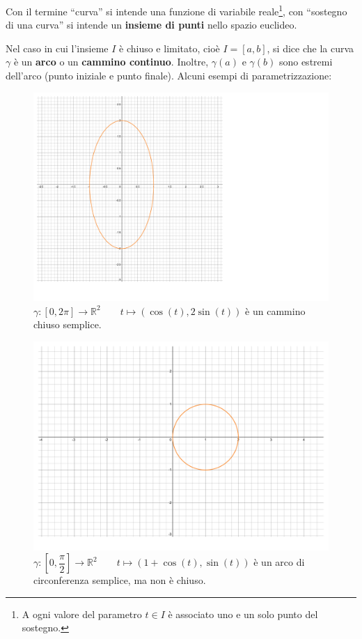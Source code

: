 \documentclass[a4paper]{article}
\newcommand{\dquotes}[1]{``#1''}
\begin{document}
	\noindent
	Con il termine \dquotes{curva} si intende una funzione di variabile reale\footnote{A ogni valore del parametro $t \in I$ è associato uno e un solo punto del sostegno.}, con \dquotes{sostegno di una curva} si intende un \textbf{insieme di punti} nello spazio euclideo.\newline

	\noindent
	Nel caso in cui l'insieme $I$ è chiuso e limitato, cioè $I = \left[a,b\right]$, si dice che la curva $\gamma$ è un \textbf{arco} o un \textbf{cammino continuo}. Inoltre, $\gamma\left(a\right)$ e $\gamma\left(b\right)$ sono estremi dell'arco (punto iniziale e punto finale). Alcuni esempi di parametrizzazione:
	\begin{figure}[!htp]
		\centering
		\includegraphics[width=.8\textwidth]{img/parametrizzazioni-1.pdf}
		\caption*{$\gamma: \left[0, 2\pi\right] \rightarrow \mathbb{R}^{2} \hspace{2em} t\mapsto\left(\cos\left(t\right), 2\sin\left(t\right)\right)$ è un cammino chiuso semplice.}
	\end{figure}\newpage

	\begin{figure}[!htp]
		\centering
		\includegraphics[width=.8\textwidth]{img/parametrizzazioni-2.pdf}
		\caption*{$\gamma: \left[0, \dfrac{\pi}{2}\right] \rightarrow \mathbb{R}^{2} \hspace{2em} t\mapsto\left(1+\cos\left(t\right), \sin\left(t\right)\right)$ è un arco di circonferenza semplice, ma non è chiuso.}
	\end{figure}
\end{document}
